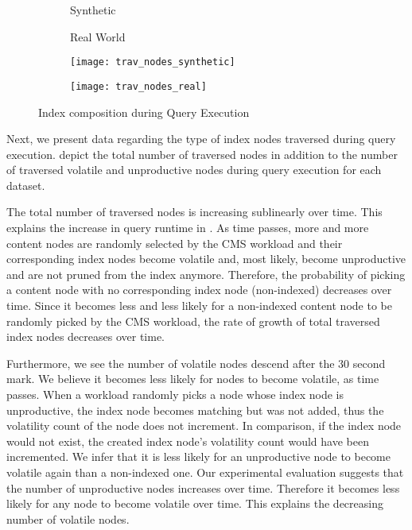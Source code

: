 \documentclass[abstracton,12pt]{scrartcl}
\theoremstyle{definition}
\begin{document}
\begin{figure}
  \centering
  \begin{subfigure}{0.49\linewidth}
    \centering
    Synthetic
  \end{subfigure}
  \begin{subfigure}{0.49\linewidth}
    \centering
    Real World
  \end{subfigure}
  \begin{subfigure}{0.49\linewidth}
    \centering
    \texttt{[image: trav\_nodes\_synthetic]}
    \caption{}
    \label{fig:trav_nodes_synthetic}
  \end{subfigure}
  \begin{subfigure}{0.49\linewidth}
    \centering
    \texttt{[image: trav\_nodes\_real]}
    \caption{}
    \label{fig:trav_nodes_real}
  \end{subfigure}
  \caption{Index composition during Query Execution}
  \label{fig:trav_nodes}
\end{figure}

Next, we present data regarding the type of index nodes traversed during query
execution.
 depict
the total number of traversed nodes in addition to the number of traversed
volatile and unproductive nodes during query execution for each dataset.

The total number of traversed nodes is increasing sublinearly over time. This
explains the increase in query runtime in
.
As time passes, more and more content nodes are randomly
selected by the CMS workload and their corresponding index nodes become volatile
and, most likely, become
unproductive and are not pruned from the index anymore.
Therefore, the probability of picking a content node with no corresponding index
node (non-indexed)
decreases over time. Since it becomes less and less likely for a non-indexed content node
to be randomly picked by the CMS workload, the rate of growth of total traversed
index nodes decreases over time.

Furthermore, we see the number of volatile nodes descend after the $30$
second mark. We believe it becomes less likely for nodes to become volatile,
as time passes. When a workload randomly picks a node whose index node is
unproductive, the index
node becomes matching but was not added, thus the volatility count of the node
does not increment. In comparison, if the index node would not exist, the created
index node's volatility count would have been incremented. We infer that it is less
likely for an unproductive node to become volatile again than a non-indexed one.
Our experimental evaluation suggests that the number of
unproductive nodes increases over time. Therefore it becomes less likely for any
node to become volatile over time. This explains the decreasing number of volatile nodes.
\end{document}

